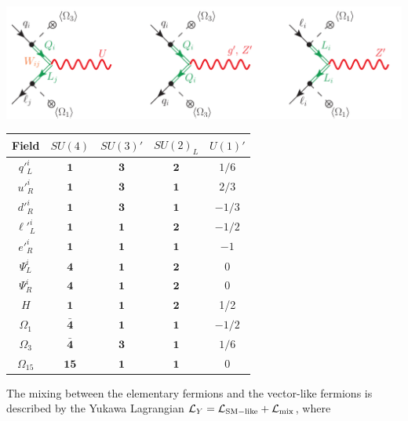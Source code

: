 \begin{center}
  \includegraphics[width=.98\textwidth]{Images/mixing.pdf}
  \label{fig:mixing}
\end{center}

\begin{center}
  \begin{tabular}{|c|c|c|c|c|}
    \hline
    Field & $SU(4)$ & $SU(3)'$ & $SU(2)_L$ & $U(1)'$ \\
    \hline
    \hline
    $q'^i_L$ & $\mathbf{1}$ & $\mathbf{3}$ & $\mathbf{2}$ & $1/6$ \\
    $u'^i_R$ & $\mathbf{1}$ & $\mathbf{3}$ & $\mathbf{1}$ & $2/3$ \\
    $d'^i_R$ & $\mathbf{1}$ & $\mathbf{3}$ & $\mathbf{1}$ & $-1/3$ \\
    $\ell'^i_L$ & $\mathbf{1}$ & $\mathbf{1}$ & $\mathbf{2}$ & $-1/2$ \\
    $e'^i_R$ & $\mathbf{1}$ & $\mathbf{1}$ & $\mathbf{1}$ & $-1$ \\
    \hline
    $\Psi^i_L$ & $\mathbf{4}$ & $\mathbf{1}$ & $\mathbf{2}$ & 0 \\
    $\Psi^i_R$ & $\mathbf{4}$ & $\mathbf{1}$ & $\mathbf{2}$ & 0 \\
    \hline
    \hline
    $H$ & $\mathbf{1}$ & $\mathbf{1}$ & $\mathbf{2}$ & 1/2 \\
    $\Omega_1$ & $\mathbf{\bar 4}$ & $\mathbf{1}$ & $\mathbf{1}$ & $-1/2$ \\
    $\Omega_3$ & $\mathbf{\bar 4}$ & $\mathbf{3}$ & $\mathbf{1}$ & $1/6$ \\
    $\Omega_{15}$ & $\mathbf{15}$ & $\mathbf{1}$ & $\mathbf{1}$ & 0 \\
    \hline
  \end{tabular}
  \label{tab:fieldcontent}
\end{center}
The mixing between the elementary fermions and the vector-like fermions is described by the Yukawa Lagrangian $\mathcal{L}_Y = \mathcal{L}_{\rm SM-like} + \mathcal{L}_{\rm mix}$, where
